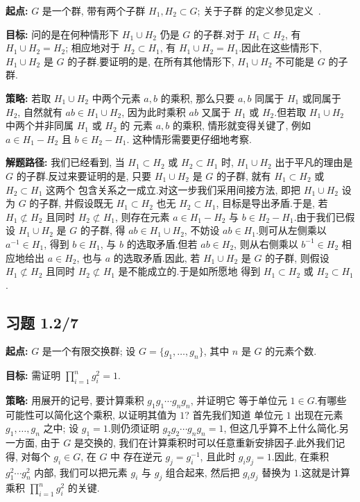\noindent\textbf{起点:} $G$ 是一个群, 带有两个子群 $H_1, H_2 \subset G$; 关于子群
的定义参见定义~.

\noindent\textbf{目标:} 问的是在何种情形下 $H_1 \cup H_2$ 仍是 $G$ 的子群.对于
$H_1 \subset H_2$, 有 $H_1 \cup H_2 = H_2$; 相应地对于 $H_2 \subset H_1$, 有
$H_1 \cup H_2 = H_1$.因此在这些情形下, $H_1 \cup H_2$ 是 $G$ 的子群.要证明的是,
在所有其他情形下, $H_1 \cup H_2$ 不可能是 $G$ 的子群.

\noindent\textbf{策略:} 若取 $H_1 \cup H_2$ 中两个元素 $a, b$ 的乘积, 那么只要
$a, b$ 同属于 $H_1$ 或同属于 $H_2$, 自然就有 $ab \in H_1 \cup H_2$, 因为此时乘积
$ab$ 又属于 $H_1$ 或 $H_2$.但若取 $H_1 \cup H_2$ 中两个并非同属 $H_1$ 或 $H_2$ 的
元素 $a, b$ 的乘积, 情形就变得关键了, 例如 $a \in H_1 - H_2$ 且 $b \in H_2 - H_1$.
这种情形需要更仔细地考察.

\noindent\textbf{解题路径:} 我们已经看到, 当 $H_1 \subset H_2$ 或 $H_2 \subset H_1$
时, $H_1 \cup H_2$ 出于平凡的理由是 $G$ 的子群.反过来要证明的是, 只要
$H_1 \cup H_2$ 是 $G$ 的子群, 就有 $H_1 \subset H_2$ 或 $H_2 \subset H_1$ 这两个
包含关系之一成立.对这一步我们采用间接方法, 即把 $H_1 \cup H_2$ 设为 $G$ 的子群,
并假设既无 $H_1 \subset H_2$ 也无 $H_2 \subset H_1$, 目标是导出矛盾.于是, 若
$H_1 \not\subset H_2$ 且同时 $H_2 \not\subset H_1$, 则存在元素 $a \in H_1 - H_2$ 与
$b \in H_2 - H_1$.由于我们已假设 $H_1 \cup H_2$ 是 $G$ 的子群, 得
$ab \in H_1 \cup H_2$, 不妨设 $ab \in H_1$.则可从左侧乘以 $a^{-1} \in H_1$, 得到
$b \in H_1$, 与 $b$ 的选取矛盾.但若 $ab \in H_2$, 则从右侧乘以 $b^{-1} \in H_2$
相应地给出 $a \in H_2$, 也与 $a$ 的选取矛盾.因此, 若 $H_1 \cup H_2$ 是 $G$ 的子群,
则假设 $H_1 \not\subset H_2$ 且同时 $H_2 \not\subset H_1$ 是不能成立的.于是如所愿地
得到 $H_1 \subset H_2$ 或 $H_2 \subset H_1$.

\subsection*{习题 1.2/7}

\noindent\textbf{起点:} $G$ 是一个有限交换群; 设 $G = \{ g_1, \ldots, g_n \}$,
其中 $n$ 是 $G$ 的元素个数.

\noindent\textbf{目标:} 需证明
$\displaystyle\prod_{i=1}^{n} g_i^2 = 1$.

\noindent\textbf{策略:} 用展开的记号, 要计算乘积 $g_1 g_1 \cdots g_n g_n$, 并证明它
等于单位元 $1 \in G$.有哪些可能性可以简化这个乘积, 以证明其值为 $1$? 首先我们知道
单位元 $1$ 出现在元素 $g_1, \ldots, g_n$ 之中; 设 $g_1 = 1$.则仍须证明
$g_2 g_2 \cdots g_n g_n = 1$, 但这几乎算不上什么简化.另一方面, 由于 $G$ 是交换的,
我们在计算乘积时可以任意重新安排因子.此外我们记得, 对每个 $g_i \in G$, 在 $G$ 中
存在逆元 $g_j = g_i^{-1}$, 且此时 $g_i g_j = 1$.因此, 在乘积
$g_1^2 \cdots g_n^2$ 内部, 我们可以把元素 $g_i$ 与 $g_j$ 组合起来, 然后把 $g_i g_j$
替换为 $1$.这就是计算乘积 $\prod_{i=1}^{n} g_i^2$ 的关键.

